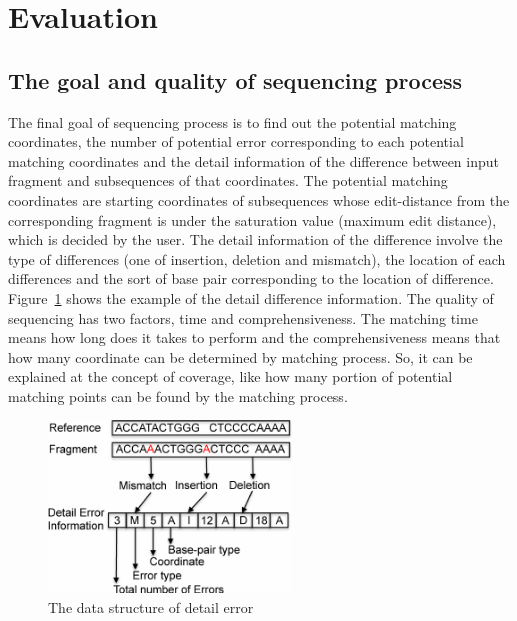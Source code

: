 \section{Evaluation} \label{sec:evaluation} 

\subsection{The goal and quality of sequencing process} 

The final goal of sequencing process is to find out the potential matching
coordinates, the number of potential error corresponding to each potential
matching coordinates and the detail information of the difference between input
fragment and subsequences of that coordinates.  The potential matching
coordinates are starting coordinates of subsequences whose edit-distance from
the corresponding fragment is under the saturation value (maximum edit
distance), which is decided by the user. The detail information of the
difference involve the type of differences (one of insertion, deletion and
mismatch), the location of each differences and the sort of base pair
corresponding to the location of difference. Figure~\ref{fig:detail_error} shows the example of
the detail difference information.  The quality of sequencing has two factors,
time and comprehensiveness. The matching time means how long does it takes to
perform and the comprehensiveness means that how many coordinate can be
determined by matching process. So, it can be explained at the concept of
coverage, like how many portion of potential matching points can be found by
the matching process.\\
\begin{figure}[t] \centering
\vspace{0.1in}
\includegraphics[height=1.8in]{./figure/Detail_Error_B.pdf} \vspace{0in}
\caption{The data structure of detail error}
\label{fig:detail_error} \end{figure}

